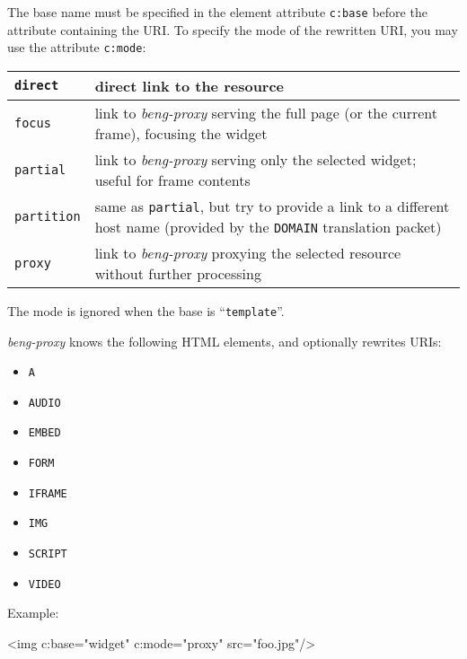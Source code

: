 \documentclass[a4paper,12pt]{article}
\begin{document}
The base name must be specified in the element attribute
\texttt{c:base} before the attribute containing the URI.  To specify
the mode of the rewritten URI, you may use the attribute
\texttt{c:mode}:

\begin{tabular}{|l|p{10cm}|}
\hline

\texttt{direct} & direct link to the resource \\

\hline

\texttt{focus} & link to \emph{beng-proxy} serving the full page (or
the current frame), focusing the widget \\

\hline

\texttt{partial} & link to \emph{beng-proxy} serving only the selected
widget; useful for frame contents \\

\hline

\texttt{partition} & same as \texttt{partial}, but try to provide a
link to a different host name (provided by the \texttt{DOMAIN}
translation packet) \\

\hline

\texttt{proxy} & link to \emph{beng-proxy} proxying the selected
resource without further processing \\

\hline
\end{tabular}

The mode is ignored when the base is ``\texttt{template}''.

\emph{beng-proxy} knows the following HTML elements, and optionally
rewrites URIs:

\begin{itemize}
\item \texttt{A}
\item \texttt{AUDIO}
\item \texttt{EMBED}
\item \texttt{FORM}
\item \texttt{IFRAME}
\item \texttt{IMG}
\item \texttt{SCRIPT}
\item \texttt{VIDEO}
\end{itemize}

Example:

\begin{verbatim*}
<img c:base="widget" c:mode="proxy" src="foo.jpg"/>
\end{verbatim*}
\end{document}
